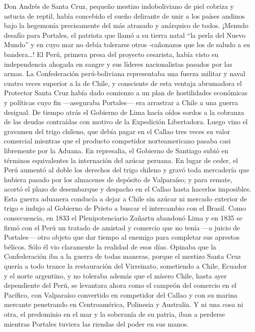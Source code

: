 \documentclass[10pt,twoside,openright]{memoir}
\begin{document}
Don Andrés de Santa Cruz, pequeño mestizo indoboliviano de piel cobriza
y astucia de reptil, había concebido el sueño delirante de unir a los
países andinos bajo la hegemonía precisamente del más atrasado y
anárquico de todos. ¡Menudo desafío para Portales, el patriota que llamó
a su tierra natal ``la perla del Nuevo Mundo'' y en cuyo mar no debía
tolerarse otros -cañonazos que los de saludo a su bandera\ldots! El Perú,
primera presa del proyecto cesarista, había visto su independencia
ahogada en sangre y sus líderes nacionalistas pasados por las armas. La
Confederación perú-boliviana representaba una fuerza militar y naval
cuatro veces superior a la de Chile, y consciente de esta ventaja
abrumadora el Protector Santa Cruz había dado comienzo a un plan de
hostilidades económicas y políticas cuyo fin ---aseguraba Portales---
era arrastrar a Chile a una guerra desigual. De tiempo atrás el Gobierno
de Lima hacía oídos sordos a la
cobranza de las deudas contraídas con motivo de la Expedición
Libertadora. Luego vino el gravamen del trigo chileno, que debía pagar
en el Callao tres veces su valor comercial mientras que el producto
competidor norteamericano pasaba casi libremente por la Aduana. En
represalia, el Gobierno de Santiago subió en términos equivalentes la
internación del azúcar peruana. En lugar de ceder, el Perú aumentó al
doble los derechos del trigo chileno y gravó toda mercadería que hubiera
pasado por los almacenes de depósito de Valparaíso; y para remate,
acortó el plazo de desembarque y despacho en el Callao hasta hacerlos
imposibles. Esta guerra aduanera conducía a dejar a Chile sin azúcar ni
mercado exterior de trigo e indujo al Gobierno de Prieto a buscar el
intercambio con el Brasil. Como consecuencia, en 1833 el
Plenipotenciario Zañartu abandonó Lima y en 1835 se firmó con el Perú un
tratado de amistad y comercio que no tenía ---a juicio de Portales---
otro objeto que dar tiempo al enemigo para completar sus aprestos
bélicos. Sólo él vio claramente la realidad de esos días. Opinaba que la
Confederación iba a la guerra de todas maneras, porque el mestizo Santa
Cruz quería a todo trance la restauración del Virreinato, sometiendo a
Chile, Ecuador y el norte argentino, y no toleraba además que el mísero
Chile, hasta ayer dependiente del Perú, se levantara ahora como el
campeón del comercio en el Pacífico, con Valparaíso convertido en
competidor del Callao y con su marina mercante penetrando en
Centroamérica, Polinesia y Australia. Y ni una cosa ni otra, el
predominio en el mar y la soberanía de su patria, iban a perderse
mientras Portales tuviera las riendas del poder en sus manos.
\end{document}
